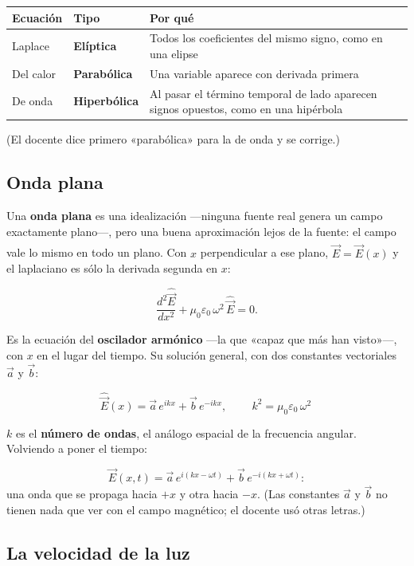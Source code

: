 \documentclass[12pt,a4paper]{article}
\begin{document}
\begin{center}
\renewcommand{\arraystretch}{1.35}
\small
\begin{tabularx}{\textwidth}{l>{\raggedright\arraybackslash}X>{\raggedright\arraybackslash}X}
\toprule
\textbf{Ecuación} & \textbf{Tipo} & \textbf{Por qué} \\
\midrule
Laplace & \textbf{Elíptica} & Todos los coeficientes del mismo signo, como en una elipse \\
Del calor & \textbf{Parabólica} & Una variable aparece con derivada primera \\
De onda & \textbf{Hiperbólica} & Al pasar el término temporal de lado aparecen signos opuestos, como en una hipérbola \\
\bottomrule
\end{tabularx}
\end{center}

(El docente dice primero «parabólica» para la de onda y se corrige.)

\subsection{Onda plana}

Una \textbf{onda plana} es una idealización ---ninguna fuente real genera un campo
exactamente plano---, pero una buena aproximación lejos de la fuente: el campo
vale lo mismo en todo un plano. Con $x$ perpendicular a ese plano,
$\hat{\vec E} = \hat{\vec E}(x)$ y el laplaciano es sólo la derivada segunda en
$x$:

\[
\frac{d^2\hat{\vec E}}{dx^2} + \mu_0\varepsilon_0\,\omega^2\,\hat{\vec E} = 0 .
\]

Es la ecuación del \textbf{oscilador armónico} ---la que «capaz que más han visto»---,
con $x$ en el lugar del tiempo. Su solución general, con dos constantes
vectoriales $\vec a$ y $\vec b$:

\[
\hat{\vec E}(x) = \vec a\,e^{ikx} + \vec b\,e^{-ikx},
\qquad
\boxed{\ k^2 = \mu_0\varepsilon_0\,\omega^2\ }
\]

$k$ es el \textbf{número de ondas}, el análogo espacial de la frecuencia angular.
Volviendo a poner el tiempo:

\[
\vec E(x,t) = \vec a\,e^{i(kx-\omega t)} + \vec b\,e^{-i(kx+\omega t)}:
\]
una onda que se propaga hacia $+x$ y otra hacia $-x$. (Las constantes $\vec a$
y $\vec b$ no tienen nada que ver con el campo magnético; el docente usó otras
letras.)

\subsection{La velocidad de la luz}
\end{document}
